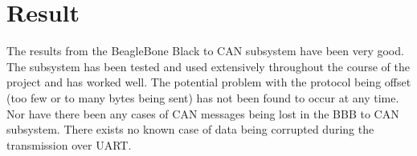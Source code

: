 
\section{Result}\label{sec:result}
The results from the BeagleBone Black to CAN subsystem have been very good. The subsystem has been tested and used extensively throughout the course of the project and has worked well. \newline
The potential problem with the protocol being offset (too few or to many bytes being sent) has not been found to occur at any time. Nor have there been any cases of CAN messages being lost in the BBB to CAN subsystem. \newline
There exists no known case of data being corrupted during the transmission over UART.
